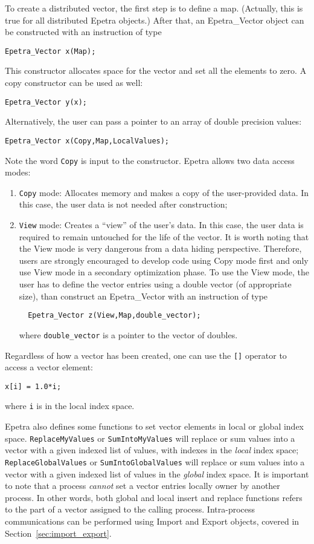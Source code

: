 To create a distributed vector, the first step is to define a map.
(Actually, this is true for all distributed Epetra objects.) After that,
an Epetra\_Vector object can be constructed with an instruction of type
\begin{verbatim}
Epetra_Vector x(Map);
\end{verbatim}
This constructor allocates space for the vector and set all the elements
to zero. A copy constructor can be used as well:
\begin{verbatim}
Epetra_Vector y(x);
\end{verbatim}
Alternatively, the user can pass a pointer to an array of double
precision values:
\begin{verbatim}
Epetra_Vector x(Copy,Map,LocalValues);
\end{verbatim}
Note the word \verb!Copy! is input to the constructor. Epetra allows two
data access modes:
\begin{enumerate}
\item \verb!Copy! mode: Allocates memory and makes a copy of the
  user-provided data. In this case, the user data is not needed after
  construction;
\item \verb!View! mode: Creates a ``view'' of the user's data. In this
  case, the user data is required to remain untouched for the life of the
  vector. It is worth noting that the View mode is very dangerous from
  a data hiding perspective. Therefore, users are strongly encouraged to
  develop code using Copy mode first and only use View mode in a
  secondary optimization phase. To use the View mode, the user has to
  define the vector entries using a double vector (of appropriate size),
  than construct an Epetra\_Vector with an instruction of type  
\begin{verbatim}
  Epetra_Vector z(View,Map,double_vector);
\end{verbatim}
  where \verb!double_vector! is a pointer to the vector of doubles.
\end{enumerate}

Regardless of how a vector has been created, one can use the \verb![]!
operator to access a vector element:
\begin{verbatim}
x[i] = 1.0*i;
\end{verbatim}
where \verb!i! is in the local index space. 

Epetra also defines some functions to set vector elements in local or
global index space.  \verb!ReplaceMyValues! or \verb!SumIntoMyValues!
will replace or sum values into a vector with a given indexed list of
values, with indexes in the {\em local} index space;
\verb!ReplaceGlobalValues! or \verb!SumIntoGlobalValues! will replace or
sum values into a vector with a given indexed list of values in the {\em
  global} index space. It is important to note that a process {\sl
  cannot} set a vector entries locally owner by another process. In
other words, both global and local insert and replace functions refers
to the part of a vector assigned to the calling process. Intra-process
communications can be performed using Import and Export objects, covered
in Section~\ref{sec:import_export}.

